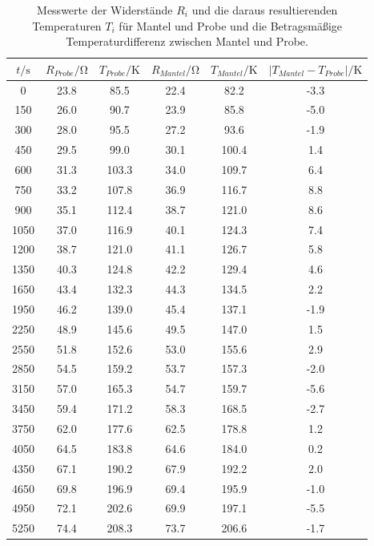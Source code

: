 \begin{table}  %
  \centering
  \caption{Messwerte der Widerstände $R_i$ und die daraus resultierenden Temperaturen $T_i$ für Mantel und Probe und die Betragsmäßige Temperaturdifferenz zwischen Mantel und Probe.}
  \label{tab:Messwerte}
  \begin{tabular}{c c c c c c}
  \toprule
  $t/\si{\second}$ & $R_{Probe}/\si{\ohm}$ & $T_{Probe}/\si{\kelvin}$ & $R_{Mantel}/\si{\ohm}$ & $T_{Mantel}/\si{\kelvin}$ & $|T_{Mantel}-T_{Probe}|/\si{\kelvin}$\\
  \midrule
  0	&	23.8	 &	85.5	&	22.4	    &	82.2	&	-3.3   \\
  150	&	26.0	&	90.7	&	23.9	&	85.8	&	-5.0   \\
  300	&	28.0	&	95.5	&	27.2	&	93.6	&	-1.9   \\
  450	&	29.5	&	99.0	&	30.1	&	100.4	&	1.4   \\
  600	&	31.3	&	103.3	&	34.0	&	109.7	&	6.4   \\
  750	&	33.2	&	107.8	&	36.9	&	116.7	&	8.8   \\
  900	&	35.1	&	112.4	&	38.7	&	121.0	&	8.6   \\
  1050	&	37.0	&	116.9	&	40.1	&	124.3	&	7.4   \\
  1200	&	38.7	&	121.0	&	41.1	&	126.7	&	5.8   \\
  1350	&	40.3	&	124.8	&	42.2	&	129.4	&	4.6   \\
  1650	&	43.4	&	132.3	&	44.3	&	134.5	&	2.2   \\
  1950	&	46.2	&	139.0	&	45.4	&	137.1	&	-1.9   \\
  2250	&	48.9	&	145.6	&	49.5	&	147.0	&	1.5   \\
  2550	&	51.8	&	152.6	&	53.0	&	155.6	&	2.9   \\
  2850	&	54.5	&	159.2	&	53.7	&	157.3	&	-2.0   \\
  3150	&	57.0	&	165.3	&	54.7	&	159.7	&	-5.6   \\
  3450	&	59.4	&	171.2	&	58.3	&	168.5	&	-2.7   \\
  3750	&	62.0	&	177.6	&	62.5	&	178.8	&	1.2   \\
  4050	&	64.5	&	183.8	&	64.6	&	184.0	&	0.2   \\
  4350	&	67.1	&	190.2	&	67.9	&	192.2	&	2.0   \\
  4650	&	69.8	&	196.9	&	69.4	&	195.9	&	-1.0   \\
  4950	&	72.1	&	202.6	&	69.9	&	197.1	&	-5.5   \\
  5250	&	74.4	&	208.3	&	73.7	&	206.6	&	-1.7   \\

\end{tabular}
\end{table}

